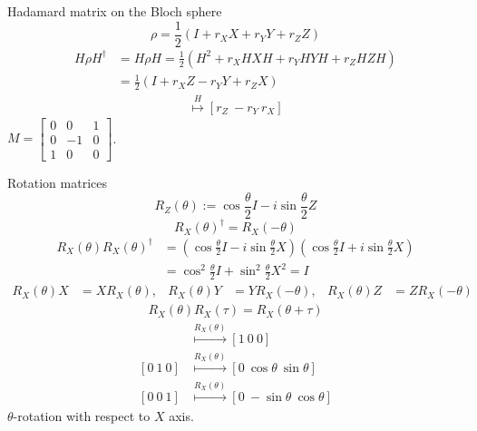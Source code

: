 \documentclass{beamer}
\newcommand\emm[1]{\textcolor{redorange}{{#1}}}
\begin{document}
\begin{frame}{Hadamard matrix on the Bloch sphere}
\begin{equation*}
\rho = \frac12\left(I + r_X X + r_Y Y + r_Z Z\right)
\end{equation*}
\begin{align*}
H\rho H^\dagger &= H\rho H =  \frac12\left(H^2 + r_X HXH + r_Y HYH + r_Z HZH\right)\\
&=  \frac12\left(I + r_X Z - r_Y Y + r_Z X\right)
\end{align*}
\begin{align*}
[r_X\ r_Y\ r_Z]\overset{H}{\longmapsto} [r_Z\ -r_Y\ r_X]
\end{align*}
$M=\begin{bmatrix}0&0&1\\0&-1&0\\1&0&0\end{bmatrix}$.
\end{frame}


\begin{frame}{Rotation matrices}
\small
\begin{equation*}
R_Z(\theta) := \cos\frac{\theta}2 I - i \sin\frac{\theta}2 Z
\end{equation*}
\begin{equation*}
R_X(\theta)^\dagger = R_X(-\theta)
\end{equation*}
\begin{align*}
R_X(\theta)R_X(\theta)^\dagger &= (\cos\frac{\theta}2 I - i \sin\frac{\theta}2 X)(\cos\frac{\theta}2 I + i \sin\frac{\theta}2 X)\\
&= \cos^2\frac{\theta}2 I + \sin^2\frac{\theta}2 X^2=I
\end{align*}
\begin{align*}
R_X(\theta)X&=X R_X(\theta),&
R_X(\theta)Y&=Y R_X(-\theta),&
R_X(\theta)Z&=Z R_X(-\theta)
\end{align*}
\begin{align*}
R_X(\theta)R_X(\tau)=R_X(\theta+\tau)
\end{align*}
\begin{align*}
[1\  0\  0]&\overset{R_X(\theta)}{\longmapsto} [1\ 0\ 0]\\
[0\  1\  0]&\overset{R_X(\theta)}{\longmapsto} [0\ \cos\theta\ \sin\theta]\\
[0\  0\  1]&\overset{R_X(\theta)}{\longmapsto} [0\ -\sin\theta\ \cos\theta]
\end{align*}
\emm{$\theta$-rotation} with respect to $X$ axis.
\end{frame}
\end{document}
